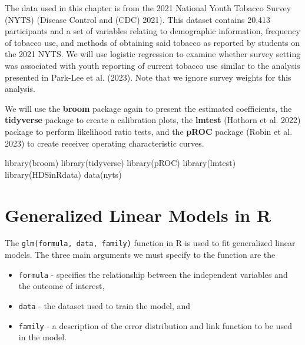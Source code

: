 \documentclass[
  letterpaper,
]{krantz}
\makeatletter
\newenvironment{Shaded}{\begin{snugshade}}{\end{snugshade}}
\newcommand{\FunctionTok}[1]{\textcolor[rgb]{0.28,0.35,0.67}{#1}}
\newcommand{\NormalTok}[1]{\textcolor[rgb]{0.00,0.23,0.31}{#1}}
\providecommand{\tightlist}{%
  \setlength{\itemsep}{0pt}\setlength{\parskip}{0pt}}\usepackage{longtable,booktabs,array}
\newenvironment{kframe}{%
\medskip{}
\setlength{\fboxsep}{.8em}
 \def\at@end@of@kframe{}%
 \ifinner\ifhmode%
  \def\at@end@of@kframe{\end{minipage}}%
  \begin{minipage}{\columnwidth}%
 \fi\fi%
 \def\FrameCommand##1{\hskip\@totalleftmargin \hskip-\fboxsep
 \colorbox{shadecolor}{##1}\hskip-\fboxsep
     \hskip-\linewidth \hskip-\@totalleftmargin \hskip\columnwidth}%
 \MakeFramed {\advance\hsize-\width
   \@totalleftmargin\z@ \linewidth\hsize
   \@setminipage}}%
 {\par\unskip\endMakeFramed%
 \at@end@of@kframe}
\renewenvironment{Shaded}{\begin{kframe}}{\end{kframe}}
\makeatother
\begin{document}
The data used in this chapter is from the 2021 National Youth Tobacco
Survey (NYTS) (Disease Control and (CDC) 2021). This dataset contains
20,413 participants and a set of variables relating to demographic
information, frequency of tobacco use, and methods of obtaining said
tobacco as reported by students on the 2021 NYTS. We will use logistic
regression to examine whether survey setting was associated with youth
reporting of current tobacco use similar to the analysis presented in
Park-Lee et al. (2023). Note that we ignore survey weights for this
analysis.

We will use the \textbf{broom} package again to present the estimated
coefficients, the \textbf{tidyverse} package to create a calibration
plots, the \textbf{lmtest} (Hothorn et al. 2022) package to perform
likelihood ratio tests, and the \textbf{pROC} package (Robin et al.
2023) to create receiver operating characteristic curves.

\begin{Shaded}
\begin{Highlighting}[]
\FunctionTok{library}\NormalTok{(broom)}
\FunctionTok{library}\NormalTok{(tidyverse)}
\FunctionTok{library}\NormalTok{(pROC)}
\FunctionTok{library}\NormalTok{(lmtest)}
\FunctionTok{library}\NormalTok{(HDSinRdata)}
\FunctionTok{data}\NormalTok{(nyts)}
\end{Highlighting}
\end{Shaded}

\hypertarget{generalized-linear-models-in-r}{%
\section{Generalized Linear Models in
R}\label{generalized-linear-models-in-r}}

The \texttt{glm(formula,\ data,\ family)} function in R is used to fit
generalized linear models. The three main arguments we must specify to
the function are the

\begin{itemize}
\tightlist
\item
  \texttt{formula} - specifies the relationship between the independent
  variables and the outcome of interest,\\
\item
  \texttt{data} - the dataset used to train the model, and\\
\item
  \texttt{family} - a description of the error distribution and link
  function to be used in the model.
\end{itemize}
\end{document}
